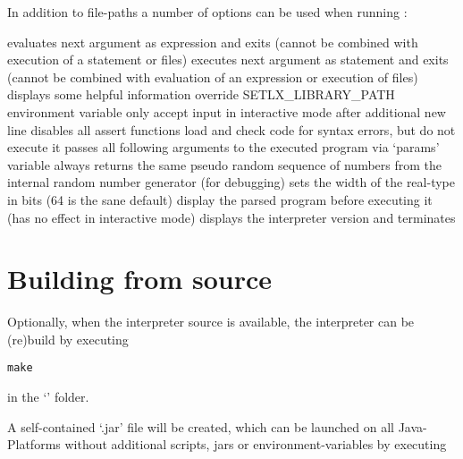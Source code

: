
In addition to file-paths a number of options can be used when running \setlX{}:

\begin{itemize}
	      {evaluates next argument as expression and exits (cannot be combined with execution of a statement or files)}
	      {executes next argument as statement and exits (cannot be combined with evaluation of an expression or execution of files)}
	      {displays some helpful information}
	      {override SETLX\_LIBRARY\_PATH environment variable}
	      {only accept input in interactive mode after additional new line}
	      {disables all assert functions}
	      {load and check code for syntax errors, but do not execute it}
	      {passes all following arguments to the executed program via `params' variable}
	      {always returns the same pseudo random sequence of numbers from the internal random number generator (for debugging)}
           {sets the width of the real-type in bits (64 is the sane default)}
           {display the parsed program before executing it (has no effect in interactive mode)}
           {displays the interpreter version and terminates}
\end{itemize}

\section{Building from source}

Optionally, when the interpreter source is available, the interpreter can be (re)build by executing

\begin{lstlisting}[frame=none,numbers=none]
make
\end{lstlisting}

in the `' folder.

A self-contained `.jar' file will be created, which can be launched on all Java-Platforms without additional scripts, jars or environment-variables by executing

